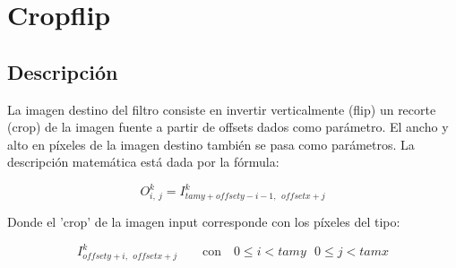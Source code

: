 \section{Cropflip}

\subsection{Descripción}
La imagen destino del filtro consiste en invertir verticalmente (flip) un recorte (crop) de la imagen fuente a partir de offsets dados como parámetro. El ancho y alto en píxeles de la imagen destino también se pasa como parámetros.
La descripción matemática está dada por la fórmula:

$$ O_{i,\ j}^{k}=I_{tamy+offsety-i-1, \ \ offsetx+j}^{k} $$

Donde el 'crop' de la imagen input corresponde con los píxeles del tipo:

$$
I_{offsety+i, \ \ offsetx+j}^{k} 
\qquad \text{con} \quad 0 \leq i < tamy \ \ \ 0 \leq j < tamx 
$$

